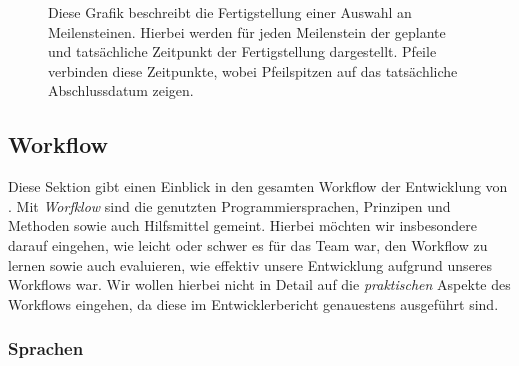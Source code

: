 \begin{figure}[h!]
  \centering
  \caption{Diese Grafik beschreibt die Fertigstellung einer Auswahl an Meilensteinen. Hierbei werden für jeden Meilenstein der geplante und tatsächliche Zeitpunkt der Fertigstellung dargestellt. Pfeile verbinden diese Zeitpunkte, wobei Pfeilspitzen auf das tatsächliche Abschlussdatum zeigen.}
  \label{fig:time-frame}
\end{figure}

\subsection{Workflow}
\label{team:orga-workflow}

Diese Sektion gibt einen Einblick in den gesamten Workflow der Entwicklung von
\erasim{}. Mit \emph{Worfklow} sind die genutzten Programmiersprachen, Prinzipen und Methoden sowie auch Hilfsmittel gemeint. Hierbei möchten wir insbesondere darauf eingehen, wie leicht oder schwer es für das Team war, den Workflow zu lernen sowie auch evaluieren, wie effektiv unsere Entwicklung aufgrund unseres Workflows war. Wir wollen hierbei nicht in Detail auf die \emph{praktischen} Aspekte des Workflows eingehen, da diese im Entwicklerbericht genauestens ausgeführt sind.

\subsubsection{Sprachen}
\label{team:orga-workflow-lang}

